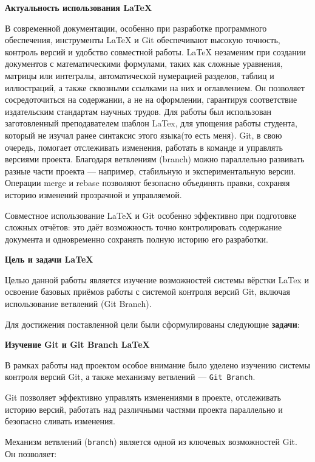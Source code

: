 \documentclass[a4paper,12pt]{report}
\begin{document}
\titlePage

\clearpage
\tableofcontents

\clearpage
\introChapter


\textbf{Актуальность использования LaTeX}

В современной документации, особенно при разработке программного обеспечения, инструменты LaTeX и Git обеспечивают высокую точность, контроль версий и удобство совместной работы.
LaTeX незаменим при создании документов с математическими формулами, таких как сложные уравнения, матрицы или интегралы, автоматической нумерацией разделов, таблиц и иллюстраций, а также сквозными ссылками на них и оглавлением. Он позволяет сосредоточиться на содержании, а не на оформлении, гарантируя соответствие издательским стандартам научных трудов.
Для работы был использован заготовленный преподавателем шаблон LaTex, для упощения работы студента, который не изучал ранее синтаксис этого языка(то есть меня).
Git, в свою очередь, помогает отслеживать изменения, работать в команде и управлять версиями проекта. Благодаря ветвлениям (branch) можно параллельно развивать разные части проекта — например, стабильную и экспериментальную версии. Операции merge и rebase позволяют безопасно объединять правки, сохраняя историю изменений прозрачной и управляемой.

Совместное использование LaTeX и Git особенно эффективно при подготовке сложных отчётов: это даёт возможность точно контролировать содержание документа и одновременно сохранять полную историю его разработки.


\textbf{Цель и задачи LaTeX}


Целью данной работы является изучение возможностей системы вёрстки  LaTex и освоение базовых приёмов работы с системой контроля версий Git, включая использование ветвлений (Git Branch).

Для достижения поставленной цели были сформулированы следующие \textbf{задачи}:


\textbf{Изучение Git и Git Branch LaTeX}

В рамках работы над проектом особое внимание было уделено изучению системы контроля версий Git, а также механизму ветвлений — \texttt{Git Branch}.

Git позволяет эффективно управлять изменениями в проекте, отслеживать историю версий, работать над различными частями проекта параллельно и безопасно сливать изменения. 

Механизм ветвлений (\texttt{branch}) является одной из ключевых возможностей Git. Он позволяет:
\end{document}
